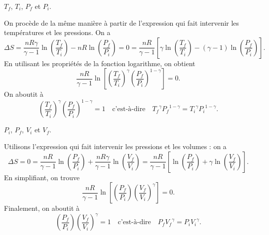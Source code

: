 


\begin{enonce}
$T_f$, $T_i$, $P_f$ et $P_i$.
\end{enonce}


\begin{corrigeNewpage}
On procède de la même manière à partir de l'expression qui fait intervenir les températures et les pressions. On a
\[
\Delta S=\frac{nR\gamma}{\gamma-1}\ln\left(\frac{T_f}{T_i}\right)-nR\ln\left(\frac{P_f}{P_i}\right)=0
=\frac{nR}{\gamma-1}\left[\gamma\ln\left(\frac{T_f}{T_i}\right)-(\gamma-1)\ln\left(\frac{P_f}{P_i}\right)\right].
\]
En utilisant les propriétés de la fonction logarithme, on obtient 
\[
\frac{nR}{\gamma-1}\ln\left[\left(\frac{T_f}{T_i}\right)^\gamma\left(\frac{P_f}{P_i}\right)^{1-\gamma}\right]=0.
\]
On aboutit à 
\[
\left(\frac{T_f}{T_i}\right)^\gamma
\left(\frac{P_f}{P_i}\right)^{1-\gamma}=1
\quad\text{c'est-à-dire}\quad
{T_f}^\gamma {P_f}^{1-\gamma}={T_i}^\gamma {P_i}^{1-\gamma}.
\]
\end{corrigeNewpage}




\begin{enonce}
$P_i$, $P_f$, $V_i$ et $V_f$.
\end{enonce}


\begin{corrige}
Utilisons l'expression qui fait intervenir les pressions et les volumes : on a
\[
\Delta S=0=
\frac{nR}{\gamma-1}\ln\left(\frac{P_f}{P_i}\right)+\frac{nR\gamma}{\gamma-1}\ln\left(\frac{V_f}{V_i}\right)=
\frac{nR}{\gamma-1}\left[\ln\left(\frac{P_f}{P_i}\right)+\gamma\ln\left(\frac{V_f}{V_i}\right)\right].
\]
En simplifiant, on trouve 
\[
\frac{nR}{\gamma-1}\ln\left[\left(\frac{P_f}{P_i}\right)\left(\frac{V_f}{V_i}\right)^\gamma\right]=0.
\]
Finalement, on aboutit à 
\[
\left(\frac{P_f}{P_i}\right)
\left(\frac{V_f}{V_i}\right)^\gamma=1
\quad\text{c'est-à-dire}\quad
P_f {V_f}^\gamma=P_i {V_i}^\gamma.
\]
\end{corrige}

